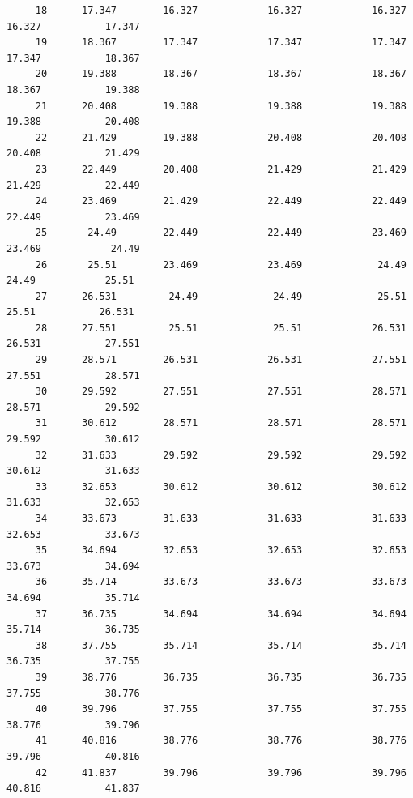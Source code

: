 \documentclass[
]{book}
\begin{document}
\begin{verbatim}
     18      17.347        16.327            16.327            16.327           16.327           17.347    
     19      18.367        17.347            17.347            17.347           17.347           18.367    
     20      19.388        18.367            18.367            18.367           18.367           19.388    
     21      20.408        19.388            19.388            19.388           19.388           20.408    
     22      21.429        19.388            20.408            20.408           20.408           21.429    
     23      22.449        20.408            21.429            21.429           21.429           22.449    
     24      23.469        21.429            22.449            22.449           22.449           23.469    
     25       24.49        22.449            22.449            23.469           23.469            24.49    
     26       25.51        23.469            23.469             24.49            24.49            25.51    
     27      26.531         24.49             24.49             25.51            25.51           26.531    
     28      27.551         25.51             25.51            26.531           26.531           27.551    
     29      28.571        26.531            26.531            27.551           27.551           28.571    
     30      29.592        27.551            27.551            28.571           28.571           29.592    
     31      30.612        28.571            28.571            28.571           29.592           30.612    
     32      31.633        29.592            29.592            29.592           30.612           31.633    
     33      32.653        30.612            30.612            30.612           31.633           32.653    
     34      33.673        31.633            31.633            31.633           32.653           33.673    
     35      34.694        32.653            32.653            32.653           33.673           34.694    
     36      35.714        33.673            33.673            33.673           34.694           35.714    
     37      36.735        34.694            34.694            34.694           35.714           36.735    
     38      37.755        35.714            35.714            35.714           36.735           37.755    
     39      38.776        36.735            36.735            36.735           37.755           38.776    
     40      39.796        37.755            37.755            37.755           38.776           39.796    
     41      40.816        38.776            38.776            38.776           39.796           40.816    
     42      41.837        39.796            39.796            39.796           40.816           41.837    

\end{verbatim}
\end{document}
